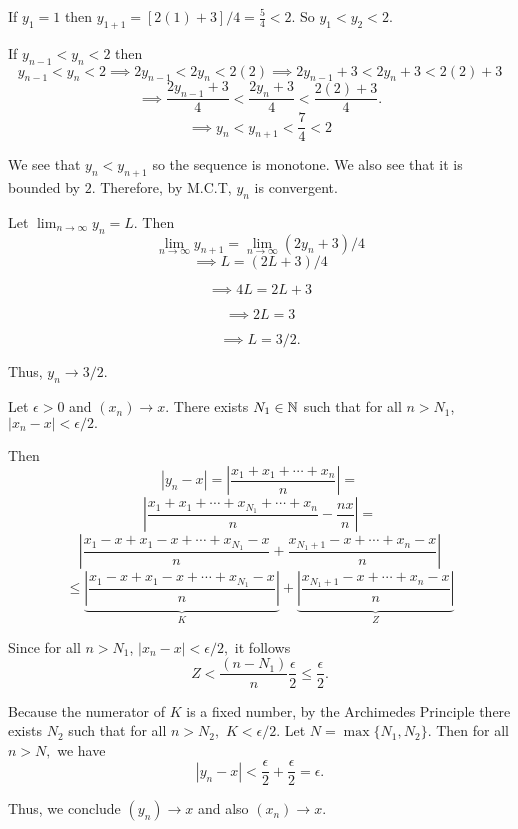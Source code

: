 \documentclass{report}
\begin{document}
\begin{myproof}

  If $y_1 = 1$ then $y_{1+1} =  [2(1) +3]/4 = \frac{5}{4} < 2.$ So $y_1 < y_2 < 2.$
    
  If $y_{n-1}<y_n<2$ then $$y_{n-1}<y_{n}<2 \implies 2y_{n-1}<2y_{n}<2(2)\implies 2y_{n-1} + 3<2y_{n} +3 <2(2) +3  $$
 $$ \implies \frac{2y_{n-1} + 3}{4}<\frac{2y_{n} +3}{4} <\frac{2(2) +3}{4}. $$
 $$ \implies y_{n} <y_{n+1} <\frac{7}{4} < 2$$

We see that $y_n < y_{n+1}$ so the sequence is monotone. We also see that it is bounded by $2.$  Therefore, by M.C.T, $y_n$ is convergent.
\par
Let $\lim_{n \rightarrow \infty} y_{n} = L$. Then $$\lim_{n \rightarrow \infty} y_{n+1} = \lim_{n \rightarrow \infty}\left(2 y_n+3\right) / 4$$ 
$$\implies L = \left(2 L+3\right) / 4$$ 

$$\implies 4L = 2 L+3$$ 

$$\implies 2L = 3$$ 

$$\implies L = 3/2.$$ 

Thus, ${y_n} \rightarrow 3/2.$
\end{myproof}
\pagebreak

\bigskip
\begin{myproof}
    
 Let $\epsilon >0 $ and $(x_n) \rightarrow x$.  There exists $N_1 \in \NN$ such that for all $n > N_1$, $| x_{n} - x| < \epsilon/2.$

  Then $$|y_n -x| = \left| \frac{x_1 + x_1 +\cdots + x_{n} }{n}  \right|= $$$$ \left| \frac{x_1 + x_1 + \cdots + x_{N_1}+ \cdots + x_{n} }{n}  - \frac{nx}{n}\right|= $$
  $$ \left| \frac{x_1 - x + x_1 - x+ \cdots + x_{N_1} - x}{n} + \frac{ x_{N_1+1} -x + \cdots + x_{n} -x }{n}  \right|  $$
  $$ \leq \underbrace{\left| \frac{x_1 -x + x_1  -x+ \cdots + x_{N_1} -x }{n} \right|}_{K}+ \underbrace{ \left|\frac{ x_{N_1 + 1} -x + \cdots + x_{n} -x  }{n}\right|}_{Z}$$

Since for all $n>N_1$, $| x_{n} - x| < \epsilon/2,$ it follows $$Z< \frac{(n - N_1)}{n} \frac{\epsilon}{2} \leq \frac{\epsilon}{2}.$$


Because the numerator of $K$ is a fixed number, by the Archimedes Principle there exists $N_2$ such that for all $n>N_2,$ $K < \epsilon/2.$ Let $N = \max\{N_1,N_2\}.$ Then for all $n > N,$ we have $$|y_n -x| < \frac{\epsilon}{2} + \frac{\epsilon}{2} = \epsilon.$$

Thus, we  conclude  $(y_n) \rightarrow x$ and also $(x_n) \rightarrow x.$
\bigskip
\end{myproof}
\end{document}
